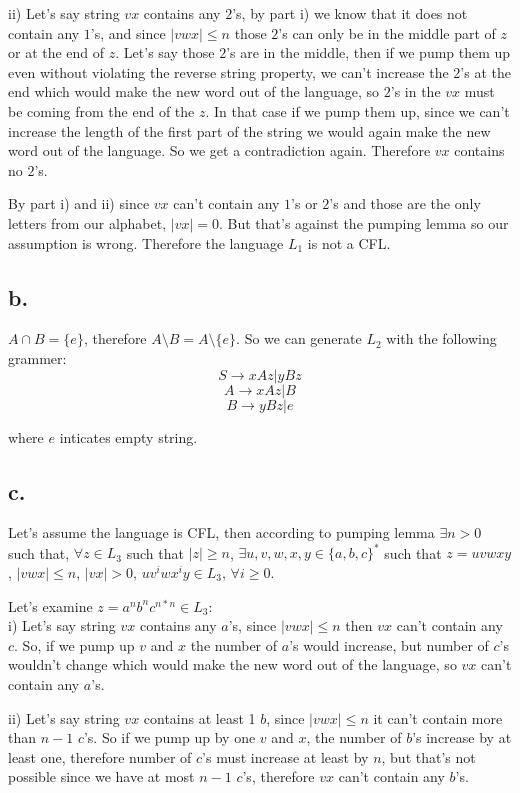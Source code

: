 \documentclass[12pt]{article}
\begin{document}
ii) Let's say string $vx$ contains any $2$'s, by part i) we know that it does not contain any
$1$'s, and since $|vwx|\le n$ those $2$'s can only be in the middle part of $z$ or at the end of
$z$. Let's say those $2$'s are in the middle, then if we pump them up even without violating
the reverse string property, we can't increase the $2$'s at the end which would make the new
word out of the language, so $2$'s in the $vx$ must be coming from the end of the $z$. In
that case if we pump them up, since we can't increase the length of the first part of the
string we would again make the new word out of the language. So we get a contradiction again.
Therefore $vx$ contains no $2$'s.

By part i) and ii) since $vx$ can't contain any $1$'s or $2$'s and those are the only letters
from our alphabet, $|vx|=0$. But that's against the pumping lemma so our assumption is wrong.
Therefore the language $L_1$ is not a CFL.

\subsection*{b.}
$A\cap B=\{e\}$, therefore $A\setminus B=A\setminus \{e\}$. So we can generate $L_2$ with the
following grammer:\\
$$S\rightarrow xAz | yBz$$
$$A\rightarrow xAz | B$$
$$B\rightarrow yBz | e$$

where $e$ inticates empty string.

\subsection*{c.}
Let's assume the language is CFL, then according to pumping lemma $\exists n>0$ such that,
$\forall z\in L_3$ such that $|z|\ge n$, $\exists u,v,w,x,y\in \{a,b,c\}^*$ such that $z=uvwxy$,
$|vwx|\le n$, $|vx|>0$, $uv^iwx^iy\in L_3$, $\forall i\ge 0$.

Let's examine $z=a^nb^nc^{n*n}\in L_3$:\\

i) Let's say string $vx$ contains any $a$'s, since $|vwx|\le n$ then $vx$ can't contain any $c$.
So, if we pump up $v$ and $x$ the number of $a$'s would increase, but number of $c$'s wouldn't
change which would make the new word out of the language, so $vx$ can't contain any $a$'s.

ii) Let's say string $vx$ contains at least 1 $b$, since $|vwx|\le n$ it can't contain more than 
$n-1$ $c$'s. So if we pump up by one $v$ and $x$, the number of $b$'s increase by at least one,
therefore number of $c$'s must increase at least by $n$, but that's not possible since we have
at most $n-1$ $c$'s, therefore $vx$ can't contain any $b$'s.
\end{document}
